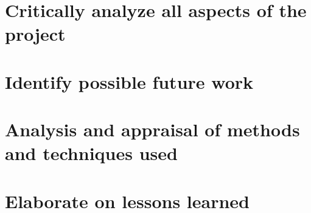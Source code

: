 \section{Critically analyze all aspects of the project}

\section{Identify possible future work}

\section{Analysis and appraisal of methods and techniques used}

\section{Elaborate on lessons learned}
